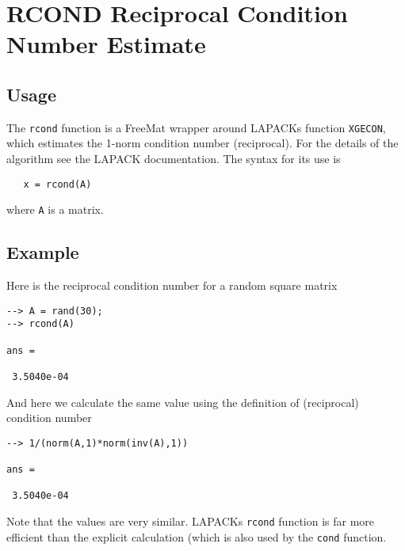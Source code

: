 \section{RCOND Reciprocal Condition Number Estimate}

\subsection{Usage}

The \verb|rcond| function is a FreeMat wrapper around LAPACKs
function \verb|XGECON|, which estimates the 1-norm condition
number (reciprocal).  For the details of the algorithm see
the LAPACK documentation.  The syntax for its use is
\begin{verbatim}
   x = rcond(A)
\end{verbatim}
where \verb|A| is a matrix.
\subsection{Example}

Here is the reciprocal condition number for a random square
matrix
\begin{verbatim}
--> A = rand(30);
--> rcond(A)

ans = 

 3.5040e-04 
\end{verbatim}
And here we calculate the same value using the definition of
(reciprocal) condition number
\begin{verbatim}
--> 1/(norm(A,1)*norm(inv(A),1))

ans = 

 3.5040e-04 
\end{verbatim}
Note that the values are very similar.  LAPACKs \verb|rcond|
function is far more efficient than the explicit calculation
(which is also used by the \verb|cond| function.
